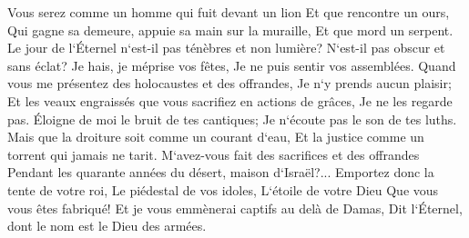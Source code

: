 \verse Vous serez comme un homme qui fuit devant un lion Et que rencontre un ours, Qui gagne sa demeure, appuie sa main sur la muraille, Et que mord un serpent. 
\verse Le jour de l`Éternel n`est-il pas ténèbres et non lumière? N`est-il pas obscur et sans éclat? 
\verse Je hais, je méprise vos fêtes, Je ne puis sentir vos assemblées. 
\verse Quand vous me présentez des holocaustes et des offrandes, Je n`y prends aucun plaisir; Et les veaux engraissés que vous sacrifiez en actions de grâces, Je ne les regarde pas. 
\verse Éloigne de moi le bruit de tes cantiques; Je n`écoute pas le son de tes luths. 
\verse Mais que la droiture soit comme un courant d`eau, Et la justice comme un torrent qui jamais ne tarit. 
\verse M`avez-vous fait des sacrifices et des offrandes Pendant les quarante années du désert, maison d`Israël?... 
\verse Emportez donc la tente de votre roi, Le piédestal de vos idoles, L`étoile de votre Dieu Que vous vous êtes fabriqué! 
\verse Et je vous emmènerai captifs au delà de Damas, Dit l`Éternel, dont le nom est le Dieu des armées. 

\chapter{}

